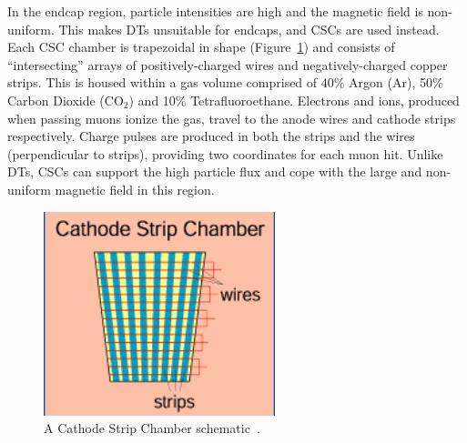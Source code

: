 In the endcap region, particle intensities are high and the magnetic field is non-uniform. This makes DTs unsuitable for endcaps, and CSCs are used instead. Each CSC chamber is trapezoidal in shape (Figure~\ref{fig:csc}) and consists of ``intersecting'' arrays of positively-charged wires and  negatively-charged copper strips. This is housed within a gas volume comprised of 40\% Argon (Ar), 50\% Carbon Dioxide ($\mathrm{CO}_{2}$) and 10\% Tetrafluoroethane. Electrons and ions, produced when passing muons ionize the gas, travel to the anode wires and cathode strips respectively. Charge pulses are produced in both the strips and the wires (perpendicular to strips), providing two coordinates for each muon hit. Unlike DTs, CSCs can support the high particle flux and cope with the large and non-uniform magnetic field in this region.


\begin{figure}
\begin{center}
  \includegraphics[width=0.6\textwidth,keepaspectratio]{plots_and_figures/chapter3/CSC.png}
\caption{A Cathode Strip Chamber schematic~\cite{muon2}.}
\label{fig:csc}
\end{center}
\end{figure}

